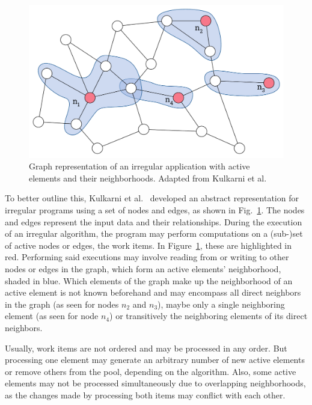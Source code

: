 \begin{figure}[b]
    \centering
    \includegraphics[width=.7\textwidth,keepaspectratio]{gfx/background-irregular}
    \caption{Graph representation of an irregular application with active elements and their neighborhoods. Adapted from Kulkarni et al.~\cite{kulkarni2009much}}%
    \label{fig:background:irregular}
\end{figure}

To better outline this, Kulkarni et al.~\cite{kulkarni2009much} developed an abstract representation for irregular programs using a set of nodes and edges, as shown in Fig.~\ref{fig:background:irregular}.
The nodes and edges represent the input data and their relationships.
During the execution of an irregular algorithm, the program may perform computations on a (sub-)set of active nodes or edges, the work items.
In Figure~\ref{fig:background:irregular}, these are highlighted in red.
Performing said executions may involve reading from or writing to other nodes or edges in the graph, which form an active elements' neighborhood, shaded in blue.
Which elements of the graph make up the neighborhood of an active element is not known beforehand and may encompass all direct neighbors in the graph (as seen for nodes $n_2$ and $n_3$), maybe only a single neighboring element (as seen for node $n_4$) or transitively the neighboring elements of its direct neighbors.

Usually, work items are not ordered and may be processed in any order.
But processing one element may generate an arbitrary number of new active elements or remove others from the pool, depending on the algorithm.
Also, some active elements may not be processed simultaneously due to overlapping neighborhoods, as the changes made by processing both items may conflict with each other.

